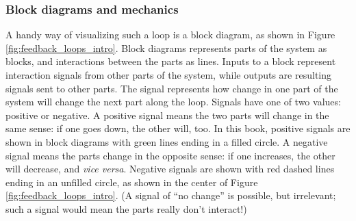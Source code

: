 \subsubsection{Block diagrams and mechanics}
A handy way of visualizing such a loop is a block diagram, as shown in Figure \ref{fig:feedback_loops_intro}. Block diagrams represents parts of the system as blocks, and interactions between the parts as lines. Inputs to a block represent interaction signals from other parts of the system, while outputs are resulting signals sent to other parts. The signal represents how change in one part of the system will change the next part along the loop. Signals have one of two values: positive or negative. A positive signal means the two parts will change in the same sense: if one goes down, the other will, too. In this book, positive signals are shown in block diagrams with green lines ending in a filled circle. A negative signal means the parts change in the opposite sense: if one increases, the other will decrease, and \textit{vice versa}. Negative signals are shown with red dashed lines ending in an unfilled circle, as shown in the center of Figure \ref{fig:feedback_loops_intro}. (A signal of ``no change'' is possible, but irrelevant; such a signal would mean the parts really don't interact!) 

